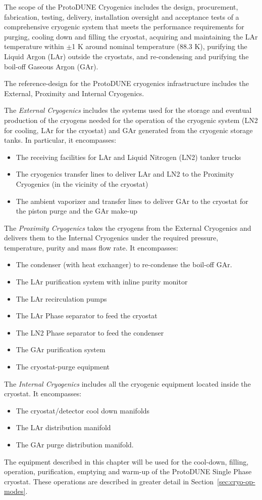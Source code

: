The scope of the ProtoDUNE Cryogenics includes the design, procurement, fabrication, testing, delivery, installation oversight and acceptance tests of a comprehensive cryogenic system that meets the performance requirements for purging, cooling down and filling the cryostat, acquiring and maintaining the LAr temperature within $\pm$1 K around nominal temperature (88.3 K), purifying the Liquid Argon (LAr) outside the cryostats, and re-condensing and purifying the boil-off Gaseous Argon (GAr).

The reference-design for the ProtoDUNE cryogenics infrastructure includes the External, Proximity and Internal Cryogenics.

%
The {\it External Cryogenics} includes the systems used for the storage and eventual production of the cryogens needed for the operation of the cryogenic system (LN2 for cooling, LAr for the cryostat) and GAr generated from the cryogenic storage tanks. In particular, it encompasses:
%
\begin{itemize}
\item The receiving facilities for LAr and Liquid Nitrogen (LN2) tanker trucks
\item The cryogenics transfer lines to deliver LAr and LN2 to the Proximity Cryogenics (in the vicinity of the cryostat)
\item The ambient vaporizer and transfer lines to deliver GAr to the cryostat for the piston purge and the GAr make-up
\end{itemize}
%
The {\it Proximity Cryogenics} takes the cryogens from the External Cryogenics and delivers them to the Internal Cryogenics under the required pressure, temperature, purity and mass flow rate. It encompasses:
%
\begin{itemize}
\item The condenser (with heat exchanger) to re-condense the boil-off GAr.
\item The LAr purification system with inline purity monitor
\item The LAr recirculation pumps
\item The LAr Phase separator to feed the cryostat
\item The LN2 Phase separator to feed the condenser
\item The GAr purification system
\item The cryostat-purge equipment
\end{itemize}
%
The {\it Internal Cryogenics} includes all the cryogenic equipment located inside the cryostat. It encompasses:
%
\begin{itemize}
\item The cryostat/detector cool down manifolds
\item The LAr distribution manifold
\item The GAr purge distribution manifold.
\end{itemize}
%
The equipment described in this chapter will be used for the cool-down, filling, operation, purification, emptying and warm-up of the ProtoDUNE Single Phase cryostat. These operations are described in greater detail in Section~\ref{sec:cryo-op-modes}.

